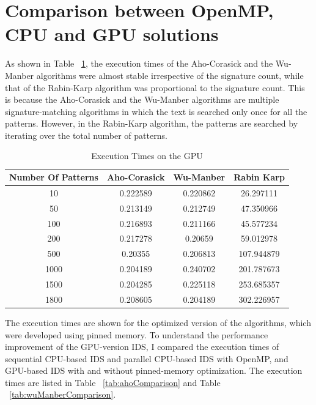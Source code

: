 \section{Comparison between OpenMP, CPU and GPU solutions}
As shown in Table ~\ref{tab:executionTimes}, the execution times of the Aho-Corasick and the Wu-Manber algorithms were almost stable irrespective of the signature count, while that of the Rabin-Karp algorithm was proportional to the signature count. This is because the Aho-Corasick and the Wu-Manber algorithms are multiple signature-matching algorithms in which the text is searched only once for all the patterns. However, in the Rabin-Karp algorithm, the patterns are searched by iterating over the total number of patterns. 

\begin {table}[H]
\centering
\caption {Execution Times on the GPU} \label{tab:executionTimes}
\begin{tabular}{|c|c|c|c|}
	\midrule
	Number Of Patterns &  Aho-Corasick &  Wu-Manber &  Rabin Karp\\
	\midrule
	10 & 0.222589    & 0.220862 &    26.297111\\
	\midrule
	50 &    0.213149 &    0.212749 &    47.350966\\
	\midrule
	100 &    0.216893 &    0.211166 &    45.577234\\
	\midrule
	200    & 0.217278 &    0.20659    & 59.012978\\
	\midrule
	500    & 0.20355 &    0.206813 &    107.944879\\
	\midrule
	1000 &    0.204189 &    0.240702 & 201.787673\\
	\midrule
	1500 &    0.204285 &    0.225118 &    253.685357\\
	\midrule
	1800 &    0.208605 &    0.204189 &    302.226957\\
	\midrule
\end{tabular}
\end{table}
\squeezeup
The execution times are shown for the optimized version of the algorithms, which were developed using pinned memory. To understand the performance improvement of the GPU-version IDS, I compared the execution times of sequential CPU-based IDS and parallel CPU-based IDS with OpenMP, and GPU-based IDS with and without pinned-memory optimization. The execution times are listed in Table ~\ref{tab:ahoComparison} and Table ~\ref{tab:wuManberComparison}. 

